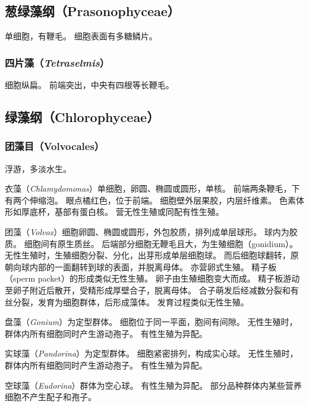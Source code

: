 \documentclass[11pt]{article}
\begin{document}
\subsection{葱绿藻纲（Prasonophyceae）}
单细胞，有鞭毛。
细胞表面有多糖鳞片。

\subsubsection{四片藻（\textit{Tetraselmis}）}
细胞纵扁。
前端突出，中央有四根等长鞭毛。

\subsection{绿藻纲（Chlorophyceae）}
\subsubsection{团藻目（Volvocales）}
浮游，多淡水生。

\newline

衣藻（\textit{Chlamydomonas}）单细胞，卵圆、椭圆或圆形，单核。
前端两条鞭毛，下有两个伸缩泡。
眼点橘红色，位于前端。
细胞壁外层果胶，内层纤维素。
色素体形如厚底杯，基部有蛋白核。
营无性生殖或同配有性生殖。

\newline

团藻（\textit{Volvox}）细胞卵圆、椭圆或圆形，外包胶质，排列成单层球形。
球内为胶质。
细胞间有原生质丝。
后端部分细胞无鞭毛且大，为生殖细胞（gonidium）。
无性生殖时，生殖细胞分裂、分化，出芽形成单层细胞球。
而后细胞球翻转，原朝向球内部的一面翻转到球的表面，并脱离母体。
亦营卵式生殖。
精子板（sperm packet）的形成类似无性生殖。
卵子由生殖细胞变大而成。
精子板游动至卵子附近后散开，受精形成厚壁合子，脱离母体。
合子萌发后经减数分裂和有丝分裂，发育为细胞群体，后形成藻体。
发育过程类似无性生殖。

\newline

盘藻（\textit{Gonium}）为定型群体。
细胞位于同一平面，胞间有间隙。
无性生殖时，群体内所有细胞同时产生游动孢子。
有性生殖为异配。

\newline

实球藻（\textit{Pandorina}）为定型群体。
细胞紧密排列，构成实心球。
无性生殖时，群体内所有细胞同时产生游动孢子。
有性生殖为异配。

\newline

空球藻（\textit{Eudorina}）群体为空心球。
有性生殖为异配。
部分品种群体内某些营养细胞不产生配子和孢子。
\end{document}
